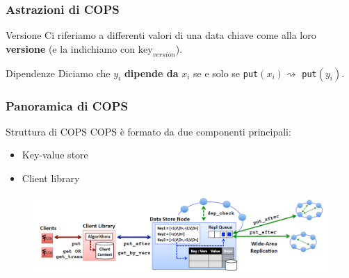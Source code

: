 \begin{frame}
\frametitle{Astrazioni di COPS}
\begin{block}{Versione}
Ci riferiamo a differenti valori di una data chiave come alla loro \textbf{versione}
(e la indichiamo con $\text{key}_{version}$).
\end{block}
\begin{block}{Dipendenze}
Diciamo che $y_i$ \textbf{dipende da} $x_i$ se e solo se \texttt{put}$(x_i)
\rightsquigarrow$ \texttt{put}$(y_i)$.
\end{block}
\end{frame}

\begin{frame}
\frametitle{Panoramica di COPS}
\begin{block}{Struttura di COPS}
COPS è formato da due componenti principali:
\begin{itemize}
	\item<1-> Key-value store
	\item<1-> Client library
\end{itemize}
\end{block}
\begin{figure}
	\centering
	\includegraphics[scale=0.35]{COPS/COPS7.png}
\end{figure}
\end{frame}

